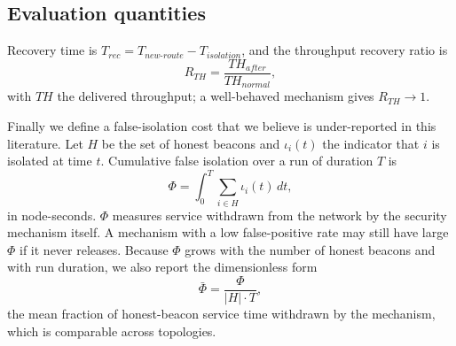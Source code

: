 \subsection{Evaluation quantities}

Recovery time is $T_{rec} = T_{new\text{-}route} - T_{isolation}$, and the
throughput recovery ratio is
\begin{equation}
\label{eq:recov}
R_{TH} = \frac{TH_{after}}{TH_{normal}},
\end{equation}
with $TH$ the delivered throughput; a well-behaved mechanism gives
$R_{TH} \to 1$.

Finally we define a false-isolation cost that we believe is under-reported in
this literature. Let $H$ be the set of honest beacons and $\iota_i(t)$ the
indicator that $i$ is isolated at time $t$. Cumulative false isolation over a
run of duration $T$ is
\begin{equation}
\label{eq:Phi}
\Phi = \int_0^T \sum_{i \in H} \iota_i(t)\, dt,
\end{equation}
in node-seconds. $\Phi$ measures service withdrawn from the network by the
security mechanism itself. A mechanism with a low false-positive rate may
still have large $\Phi$ if it never releases. Because $\Phi$ grows with the
number of honest beacons and with run duration, we also report the
dimensionless form
\begin{equation}
\label{eq:Phibar}
\bar\Phi = \frac{\Phi}{|H| \cdot T},
\end{equation}
the mean fraction of honest-beacon service time withdrawn by the mechanism,
which is comparable across topologies.
